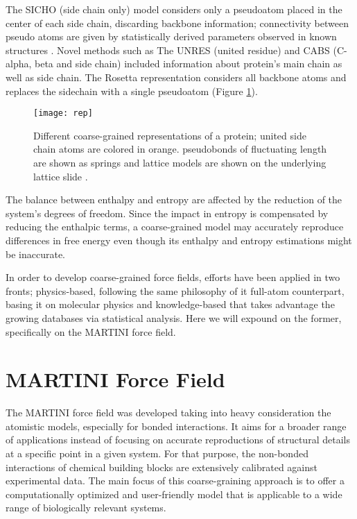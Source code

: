 \documentclass[
	12pt,				%
	openright,			%
	twoside,			%
	a4paper,			%
	english,			%
	french,				%
	spanish,			%
	brazil,				%
	]{abntex2}
\begin{document}
The SICHO (side chain only) model considers only a pseudoatom placed in the center of each side chain, discarding backbone information; connectivity between pseudo atoms are given by statistically derived parameters observed in known structures \cite{Kolinski1998}. Novel methods such as The UNRES (united residue) \cite{Liwo2014} and CABS (C-alpha, beta and side chain) \cite{Kurcinski2015} included information about protein’s main chain as well as side chain. The Rosetta representation considers all backbone atoms and replaces the sidechain with a single pseudoatom \cite{johnson2004numerical} (Figure \ref{fig:rep}).

\begin{figure}
	\centering
	\texttt{[image: rep]}
	\caption{Different coarse-grained representations of a protein; united side chain atoms are colored in orange. pseudobonds of fluctuating length are shown as springs and lattice models are shown on the underlying lattice slide \cite{Kmiecik2016}.}
	\label{fig:rep}
\end{figure}

The balance between enthalpy and entropy are affected by the reduction of the system’s degrees of freedom. Since the impact in entropy is compensated by reducing the enthalpic terms, a coarse-grained model may accurately reproduce differences in free energy even though its enthalpy and entropy estimations might be inaccurate.

In order to develop coarse-grained force fields, efforts have been applied in two fronts; physics-based, following the same philosophy of it full-atom counterpart, basing it on molecular physics and knowledge-based that takes advantage the growing databases via statistical analysis. Here we will expound on the former, specifically on the MARTINI \cite{Marrink2007} force field.

\section{MARTINI Force Field}

The MARTINI force field was developed taking into heavy consideration the atomistic models, especially for bonded interactions. It aims for a broader range of applications instead of focusing on accurate reproductions of structural details at a specific point in a given system. For that purpose, the non-bonded interactions of chemical building blocks are extensively calibrated against experimental data. The main focus of this coarse-graining approach is to offer a computationally optimized and user-friendly model that is applicable to a wide range of biologically relevant systems.
\end{document}
